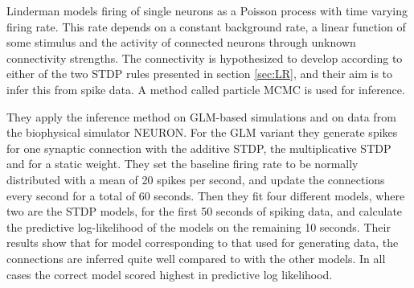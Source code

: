 Linderman models firing of single neurons as a Poisson process with time varying firing rate. This rate depends on a constant background rate, a linear function of some stimulus and the activity of connected neurons through unknown connectivity strengths. The connectivity is hypothesized to develop according to either of the two STDP rules presented in section \ref{sec:LR}, and their aim is to infer this from spike data. A method called particle MCMC is used for inference. 

They apply the inference method on GLM-based simulations and on data from the biophysical simulator NEURON. For the GLM variant they generate spikes for one synaptic connection with the additive STDP, the multiplicative STDP and for a static weight. They set the baseline firing rate to be normally distributed with a mean of 20 spikes per second, and update the connections every second for a total of 60 seconds. Then they fit four different models, where two are the STDP models, for the first 50 seconds of spiking data, and calculate the predictive log-likelihood of the models on the remaining 10 seconds. Their results show that for model corresponding to that used for generating data, the connections are inferred quite well compared to with the other models. In all cases the correct model scored highest in predictive log likelihood. 













\cleardoublepage